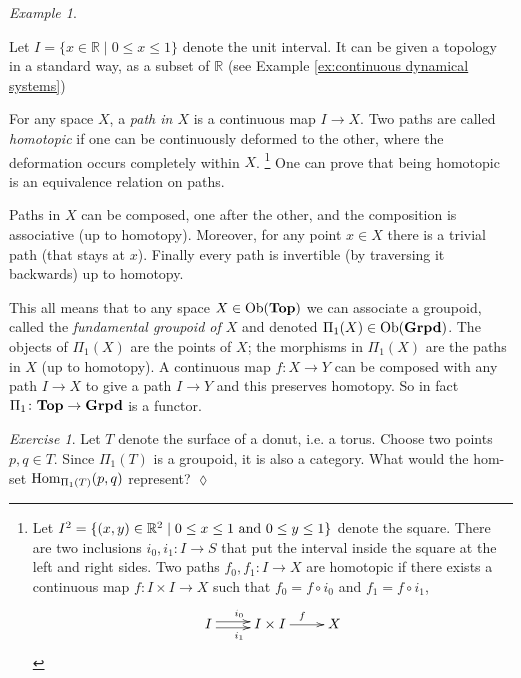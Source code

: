 \documentclass{book}
\def\tn{\textnormal}
\def\RR{{\mathbb R}}
\def\Hom{\tn{Hom}}
\def\Ob{\tn{Ob}}
\def\to{\rightarrow}
\def\taking{\colon}
\def\|{{\;|\;}}
\def\Top{{\bf Top}}
\def\Grpd{{\bf Grpd}}
\theoremstyle{remark}
\newtheorem{example}[subsubsection]{Example}
\newtheorem{exc}[subsubsection]{Exercise}
\newenvironment{exercise}{\begin{exc}}{\hspace*{\fill}$\lozenge$\end{exc}}
\theoremstyle{definition}
\begin{document}
\begin{example}\label{ex:fundamental groupoid}

Let $I=\{x\in\RR\|0\leq x\leq 1\}$ denote the unit interval. It can be given a topology in a standard way, as a subset of $\RR$ (see Example \ref{ex:continuous dynamical systems})

For any space $X$, a {\em path in $X$} is a continuous map $I\to X$. Two paths are called {\em homotopic} if one can be continuously deformed to the other, where the deformation occurs completely within $X$.
\footnote{
Let $I^2=\{(x,y)\in\RR^2\|0\leq x\leq 1 \tn{ and } 0\leq y\leq 1\}$ denote the square. There are two inclusions $i_0,i_1\taking I\to S$ that put the interval inside the square at the left and right sides. Two paths $f_0,f_1\taking I\to X$ are homotopic if there exists a continuous map $f\taking I\times I\to X$ such that $f_0=f\circ i_0$ and $f_1=f\circ i_1$, 
$$\xymatrix{I\ar@<-.5ex>[r]_{i_1}\ar@<.5ex>[r]^{i_0}&I\times I\ar[r]^f&X}$$
} 
One can prove that being homotopic is an equivalence relation on paths. 

Paths in $X$ can be composed, one after the other, and the composition is associative (up to homotopy). Moreover, for any point $x\in X$ there is a trivial path (that stays at $x$). Finally every path is invertible (by traversing it backwards) up to homotopy. 

This all means that to any space $X\in\Ob(\Top)$ we can associate a groupoid, called the {\em fundamental groupoid of $X$} and denoted $\Pi_1(X)\in\Ob(\Grpd)$. The objects of $\Pi_1(X)$ are the points of $X$; the morphisms in $\Pi_1(X)$ are the paths in $X$ (up to homotopy). A continuous map $f\taking X\to Y$ can be composed with any path $I\to X$ to give a path $I\to Y$ and this preserves homotopy. So in fact $\Pi_1\taking\Top\to\Grpd$\index{a functor!$\Pi_1\taking\Top\to\Grpd$} is a functor.

\end{example}

\begin{exercise}
Let $T$ denote the surface of a donut, i.e. a torus. Choose two points $p,q\in T$. Since $\Pi_1(T)$ is a groupoid, it is also a category. What would the hom-set $\Hom_{\Pi_1(T)}(p,q)$ represent?
\end{exercise}
\end{document}
